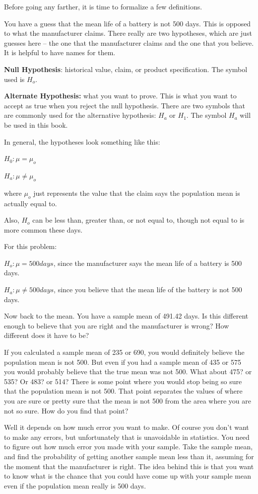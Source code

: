 \documentclass[]{book}
\begin{document}
Before going any farther, it is time to formalize a few definitions.

You have a guess that the mean life of a battery is not 500 days. This is opposed to what the manufacturer claims. There really are two hypotheses, which are just guesses here -- the one that the manufacturer claims and the one that you believe. It is helpful to have names for them.

\textbf{Null Hypothesis}: historical value, claim, or product specification. The symbol used is \(H_o\).

\textbf{Alternate Hypothesis:} what you want to prove. This is what you want to accept as true when you reject the null hypothesis. There are two symbols that are commonly used for the alternative hypothesis: \(H_a\) or \(H_1\). The symbol \(H_a\) will be used in this book.

In general, the hypotheses look something like this:

\(H_0:\mu=\mu_o\)

\(H_a:\mu\ne \mu_o\)

where \(\mu_o\) just represents the value that the claim says the population mean is actually equal to.

Also, \(H_o\) can be less than, greater than, or not equal to, though not equal to is more common these days.

For this problem:

\(H_o:\mu=500days\), since the manufacturer says the mean life of a battery is 500 days.

\(H_a:\mu\ne 500days\), since you believe that the mean life of the battery is not 500 days.

Now back to the mean. You have a sample mean of 491.42 days. Is this different enough to believe that you are right and the manufacturer is wrong? How different does it have to be?

If you calculated a sample mean of 235 or 690, you would definitely believe the population mean is not 500. But even if you had a sample mean of 435 or 575 you would probably believe that the true mean was not 500. What about 475? or 535? Or 483? or 514? There is some point where you would stop being so sure that the population mean is not 500. That point separates the values of where you are sure or pretty sure that the mean is not 500 from the area where you are not so sure. How do you find that point?

Well it depends on how much error you want to make. Of course you don't want to make any errors, but unfortunately that is unavoidable in statistics. You need to figure out how much error you made with your sample. Take the sample mean, and find the probability of getting another sample mean less than it, assuming for the moment that the manufacturer is right. The idea behind this is that you want to know what is the chance that you could have come up with your sample mean even if the population mean really is 500 days.
\end{document}
